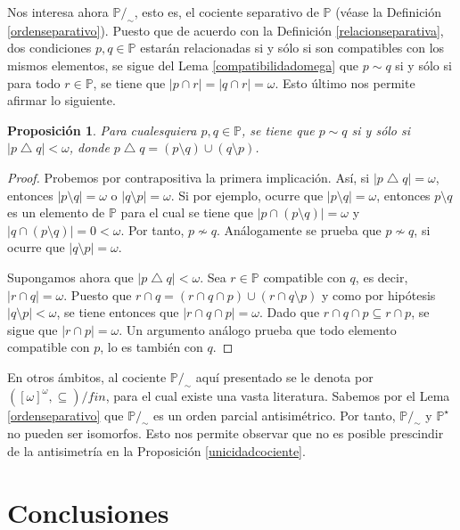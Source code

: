 \documentclass[11pt]{unam_tesis1}
\theoremstyle{MyThmStyle}
\theoremstyle{definition}
\theoremstyle{plain}
\newtheorem{proposition}[definition]{Proposici\'on}
\theoremstyle{remark}
\begin{document}
Nos interesa ahora $\mathbb P/_\sim$, esto es, el cociente separativo de $\mathbb P$ (v\'ease la Definici\'on \ref{ordenseparativo}). Puesto que de acuerdo con la Definici\'on \ref{relacionseparativa}, dos condiciones $p,q\in \mathbb P$ estar\'an relacionadas si y s\'olo si son compatibles con los mismos elementos, se sigue del Lema \ref{compatibilidadomega} que $p\sim q$ si y s\'olo si para todo $r\in \mathbb P$, se tiene que $|p\cap r|=|q\cap r|=\omega$. Esto \'ultimo nos permite afirmar lo siguiente.

\begin{proposition}
Para cualesquiera $p,q\in \mathbb P$, se tiene que $p\sim q$ si y s\'olo si $|p\bigtriangleup q|<\omega$, donde $p\bigtriangleup q=(p\setminus q)\cup (q\setminus p)$.
\end{proposition}

\begin{proof}
Probemos por contrapositiva la primera implicaci\'on. As\'i, si $|p\bigtriangleup q|=\omega$, entonces $|p\setminus q|=\omega$ o $|q\setminus p|=\omega$. Si por ejemplo, ocurre que $|p\setminus q|=\omega$, entonces $p\setminus q$ es un elemento de $\mathbb P$ para el cual se tiene que $|p\cap (p\setminus q)|=\omega$ y $|q\cap (p\setminus q)|=0<\omega$. Por tanto, $p\not\sim q$. An\'alogamente se prueba que $p\not\sim q$, si ocurre que $|q\setminus p|=\omega$.

Supongamos ahora que $|p\bigtriangleup q|<\omega$. Sea $r\in \mathbb P$ compatible con $q$, es decir, $|r\cap q|=\omega$. Puesto que $r\cap q=(r\cap q\cap p)\cup (r\cap q\setminus p)$ y como por hip\'otesis $|q\setminus p|<\omega$, se tiene entonces que $|r\cap q\cap p|=\omega$. Dado que $r\cap q\cap p\subseteq r\cap p$, se sigue que $|r\cap p|=\omega$. Un argumento an\'alogo prueba que todo elemento compatible con $p$, lo es tambi\'en con $q$.
\end{proof}

En otros \'ambitos, al cociente $\mathbb P/_\sim$ aqu\'i presentado se le denota por $([\omega]^\omega,\subseteq)/fin$, para el cual existe una vasta literatura. Sabemos por el Lema \ref{ordenseparativo} que $\mathbb P/_\sim$ es un orden parcial antisim\'etrico. Por tanto, $\mathbb P/_\sim$ y $\mathbb P^\star$ no pueden ser isomorfos. Esto nos permite observar que no es posible prescindir de la antisimetr\'ia en la Proposici\'on \ref{unicidadcociente}.

\chapter*{Conclusiones}
\end{document}
